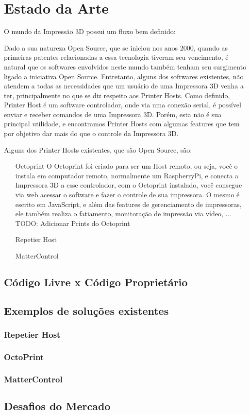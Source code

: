 \section{Estado da Arte}
O mundo da Impressão 3D possui um fluxo bem definido: 



Dado a sua natureza Open Source, que se iniciou nos anos 2000, quando as primeiras patentes relacionadas a essa tecnologia tiveram seu vencimento, é natural que os softwares envolvidos neste mundo também tenham seu surgimento ligado a iniciativa Open Source.
Entretanto, alguns dos softwares existentes, não atendem a todas as necessidades que um usuário de uma Impressora 3D venha a ter, principalmente no que se diz respeito aos Printer Hosts.
Como definido, Printer Host é um software controlador, onde via uma conexão serial, é possível enviar e receber comandos de uma Impressora 3D. Porém, esta não é sua principal utilidade, e encontramos Printer Hosts com algumas features que tem por objetivo dar mais do que o controle da Impressora 3D. 

Alguns dos Printer Hosts existentes, que são Open Source, são:
\begin{itemize}
\item [Octoprint]
O Octoprint foi criado para ser um Host remoto, ou seja, você o instala em computador remoto, normalmente um RaspberryPi, e conecta a Impressora 3D a esse controlador, com o Octoprint instalado, você consegue via web acessar o software e fazer o controle de sua impressora. O mesmo é escrito em JavaScript, e além das features de gerenciamento de impressoras, ele também realiza o fatiamento, monitoração de impressão via vídeo, ...
TODO: Adicionar Prints do Octoprint

\item [Repetier Host]

\item [MatterControl]

\end{itemize}

\subsection{Código Livre x Código Proprietário}
\subsection{Exemplos de soluções existentes}
\subsubsection{Repetier Host}
\subsubsection{OctoPrint}
\subsubsection{MatterControl}
\subsection{Desafios do Mercado}
